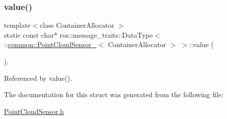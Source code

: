 \subsubsection{\texorpdfstring{value()}{value()}\hspace{0.1cm}{\footnotesize\ttfamily [2/2]}}
{\footnotesize\ttfamily template$<$class Container\+Allocator $>$ \\
static const char$\ast$ ros\+::message\+\_\+traits\+::\+Data\+Type$<$ \+::\hyperlink{structcommon_1_1PointCloudSensor__}{common\+::\+Point\+Cloud\+Sensor\+\_\+}$<$ Container\+Allocator $>$ $>$\+::value (\begin{DoxyParamCaption}\item[{const \+::\hyperlink{structcommon_1_1PointCloudSensor__}{common\+::\+Point\+Cloud\+Sensor\+\_\+}$<$ Container\+Allocator $>$ \&}]{ }\end{DoxyParamCaption})\hspace{0.3cm}{\ttfamily [inline]}, {\ttfamily [static]}}



Referenced by value().



The documentation for this struct was generated from the following file\+:\begin{DoxyCompactItemize}
\item 
\hyperlink{PointCloudSensor_8h}{Point\+Cloud\+Sensor.\+h}\end{DoxyCompactItemize}
